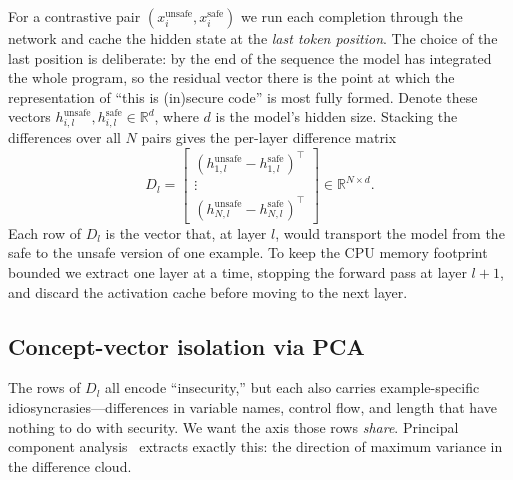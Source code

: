 \documentclass[11pt,a4paper]{article}
\newcommand{\R}{\mathbb{R}}
\begin{document}
For a contrastive pair $(x^{\text{unsafe}}_i, x^{\text{safe}}_i)$ we run each completion through the network and cache the hidden state at the \emph{last token position}. The choice of the last position is deliberate: by the end of the sequence the model has integrated the whole program, so the residual vector there is the point at which the representation of ``this is (in)secure code'' is most fully formed. Denote these vectors $h^{\text{unsafe}}_{i,l}, h^{\text{safe}}_{i,l} \in \R^{d}$, where $d$ is the model's hidden size. Stacking the differences over all $N$ pairs gives the per-layer difference matrix
\begin{equation}
D_l = \begin{bmatrix}
(h^{\text{unsafe}}_{1,l} - h^{\text{safe}}_{1,l})^{\top} \\
\vdots \\
(h^{\text{unsafe}}_{N,l} - h^{\text{safe}}_{N,l})^{\top}
\end{bmatrix} \in \R^{N \times d}.
\label{eq:diffmat}
\end{equation}
Each row of $D_l$ is the vector that, at layer $l$, would transport the model from the safe to the unsafe version of one example. To keep the CPU memory footprint bounded we extract one layer at a time, stopping the forward pass at layer $l{+}1$, and discard the activation cache before moving to the next layer.

\subsection{Concept-vector isolation via PCA}
\label{sec:pca}
The rows of $D_l$ all encode ``insecurity,'' but each also carries example-specific idiosyncrasies---differences in variable names, control flow, and length that have nothing to do with security. We want the axis those rows \emph{share}. Principal component analysis~\cite{jolliffe2002pca} extracts exactly this: the direction of maximum variance in the difference cloud.
\end{document}
